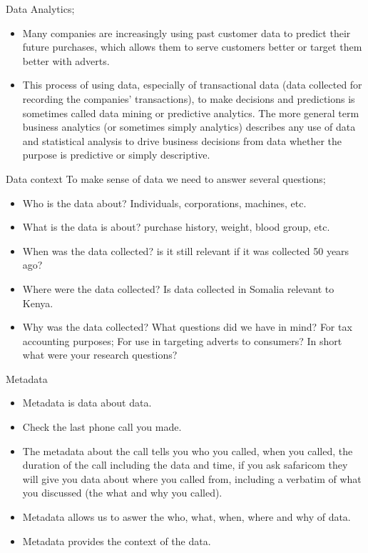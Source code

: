 \documentclass[
  ignorenonframetext,
]{beamer}
\begin{document}
\begin{frame}{Data Analytics;}
\protect\hypertarget{data-analytics}{}
\begin{itemize}
\item
  Many companies are increasingly using past customer data to predict
  their future purchases, which allows them to serve customers better or
  target them better with adverts.
\item
  This process of using data, especially of transactional data (data
  collected for recording the companies' transactions), to make
  decisions and predictions is sometimes called data mining or
  predictive analytics. The more general term business analytics (or
  sometimes simply analytics) describes any use of data and statistical
  analysis to drive business decisions from data whether the purpose is
  predictive or simply descriptive.
\end{itemize}
\end{frame}

\begin{frame}{Data context}
\protect\hypertarget{data-context}{}
To make sense of data we need to answer several questions;

\begin{itemize}
\item
  Who is the data about? Individuals, corporations, machines, etc.
\item
  What is the data is about? purchase history, weight, blood group, etc.
\item
  When was the data collected? is it still relevant if it was collected
  50 years ago?
\item
  Where were the data collected? Is data collected in Somalia relevant
  to Kenya.
\item
  Why was the data collected? What questions did we have in mind? For
  tax accounting purposes; For use in targeting adverts to consumers? In
  short what were your research questions?
\end{itemize}
\end{frame}

\begin{frame}{Metadata}
\protect\hypertarget{metadata}{}
\begin{itemize}
\item
  Metadata is data about data.
\item
  Check the last phone call you made.
\item
  The metadata about the call tells you who you called, when you called,
  the duration of the call including the data and time, if you ask
  safaricom they will give you data about where you called from,
  including a verbatim of what you discussed (the what and why you
  called).
\item
  Metadata allows us to aswer the who, what, when, where and why of
  data.
\item
  Metadata provides the context of the data.
\end{itemize}
\end{frame}
\end{document}
